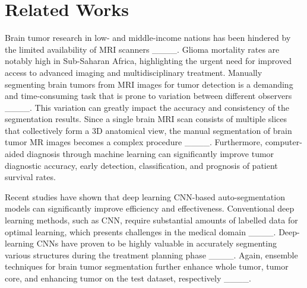\section{Related Works}
Brain tumor research in low- and middle-income nations has been hindered by the limited availability of MRI scanners ____. Glioma mortality rates are notably high in Sub-Saharan Africa, highlighting the urgent need for improved access to advanced imaging and multidisciplinary treatment. Manually segmenting brain tumors from MRI images for tumor detection is a demanding and time-consuming task that is prone to variation between different observers ____. This variation can greatly impact the accuracy and consistency of the segmentation results. Since a single brain MRI scan consists of multiple slices that collectively form a 3D anatomical view, the manual segmentation of brain tumor MR images becomes a complex procedure ____. Furthermore, computer-aided diagnosis through machine learning can significantly improve tumor diagnostic accuracy, early detection, classification, and prognosis of patient survival rates.

Recent studies have shown that deep learning CNN-based auto-segmentation models can significantly improve efficiency and effectiveness. Conventional deep learning methods, such as CNN, require substantial amounts of labelled data for optimal learning, which presents challenges in the medical domain ____. Deep-learning CNNs have proven to be highly valuable in accurately segmenting various structures during the treatment planning phase ____.
Again, ensemble techniques for brain tumor segmentation further enhance whole tumor, tumor core, and enhancing tumor on the test dataset, respectively ____.